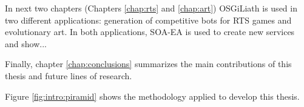 In next two chapters (Chapters \ref{chap:rts} and \ref{chap:art}) OSGiLiath is used in two different applications: generation of competitive bots for RTS games and evolutionary art. In both applications, SOA-EA is used to create new services and show...

Finally, chapter \ref{chap:conclusions} summarizes the main contributions of this thesis and future lines of research.

Figure \ref{fig:intro:piramid} shows the methodology applied to develop this thesis.

